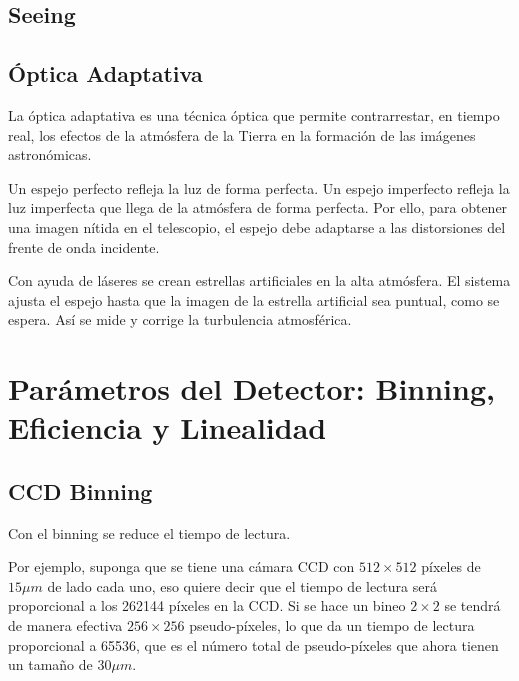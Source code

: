 \documentclass{article}
\begin{document}
\subsection{Seeing}


\subsection{Óptica Adaptativa}
La óptica adaptativa es una técnica óptica que permite contrarrestar, en tiempo real, los efectos de la atmósfera de la Tierra en la formación de las imágenes astronómicas.

Un espejo perfecto refleja la luz de forma perfecta. Un espejo imperfecto refleja la luz imperfecta que llega de la atmósfera de forma perfecta. Por ello, para obtener una imagen nítida en el telescopio, el espejo debe adaptarse a las distorsiones del frente de onda incidente.



Con ayuda de láseres se crean estrellas artificiales en la alta atmósfera. El sistema ajusta el espejo hasta que la imagen de la estrella artificial sea puntual, como se espera. Así se mide y corrige la turbulencia atmosférica.



\section{Parámetros del Detector: Binning, Eficiencia y Linealidad}

\subsection{CCD Binning}
Con el binning se reduce el tiempo de lectura.

Por ejemplo, suponga que se tiene una cámara CCD con $512 \times 512$ píxeles de $15\mu m$ de lado cada uno, eso quiere decir que el tiempo de lectura será proporcional a los 262144 píxeles en la CCD. Si se hace un bineo $2 \times 2$ se tendrá de manera efectiva $256 \times 256$ pseudo-píxeles, lo que da un tiempo de lectura proporcional a 65536, que es el número total de pseudo-píxeles que ahora tienen un tamaño de $30\mu m$.
\end{document}
